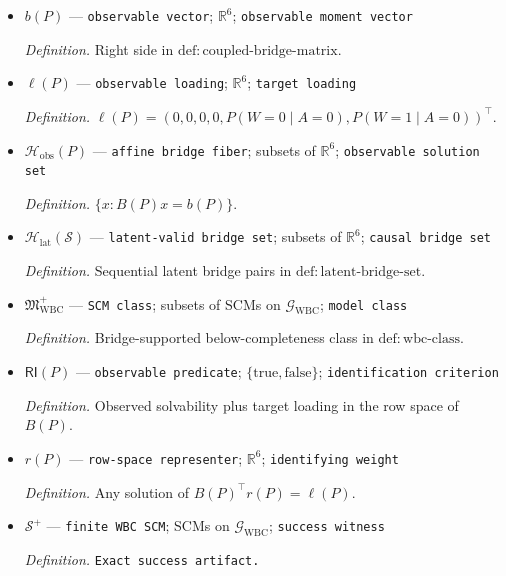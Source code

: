 \documentclass{article}
\begin{document}
\begin{itemize}
  \par\smallskip\noindent\emph{Definition.} Coupled bridge matrix in \(\mathrm{def{:}coupled\text{-}bridge\text{-}matrix}\).
  \item \(b(P)\) --- \texttt{observable vector}; \(\mathbb R^6\); \texttt{observable moment vector}
  \par\smallskip\noindent\emph{Definition.} Right side in \(\mathrm{def{:}coupled\text{-}bridge\text{-}matrix}\).
  \item \(\ell(P)\) --- \texttt{observable loading}; \(\mathbb R^6\); \texttt{target loading}
  \par\smallskip\noindent\emph{Definition.} \(\ell(P)=(0,0,0,0,P(W=0\mid A=0),P(W=1\mid A=0))^{\top}\).
  \item \(\mathcal H_{\mathrm{obs}}(P)\) --- \texttt{affine bridge fiber}; subsets of \(\mathbb R^6\); \texttt{observable solution set}
  \par\smallskip\noindent\emph{Definition.} \(\{x:B(P)x=b(P)\}\).
  \item \(\mathcal H_{\mathrm{lat}}(\mathcal S)\) --- \texttt{latent-\allowbreak{}valid bridge set}; subsets of \(\mathbb R^6\); \texttt{causal bridge set}
  \par\smallskip\noindent\emph{Definition.} Sequential latent bridge pairs in \(\mathrm{def{:}latent\text{-}bridge\text{-}set}\).
  \item \(\mathfrak M_{\mathrm{WBC}}^{+}\) --- \texttt{SCM class}; subsets of SCMs on \(\mathcal G_{\mathrm{WBC}}\); \texttt{model class}
  \par\smallskip\noindent\emph{Definition.} Bridge-supported below-completeness class in \(\mathrm{def{:}wbc\text{-}class}\).
  \item \(\mathsf{RI}(P)\) --- \texttt{observable predicate}; \(\{\mathrm{true},\mathrm{false}\}\); \texttt{identification criterion}
  \par\smallskip\noindent\emph{Definition.} Observed solvability plus target loading in the row space of \(B(P)\).
  \item \(r(P)\) --- \texttt{row-\allowbreak{}space representer}; \(\mathbb R^6\); \texttt{identifying weight}
  \par\smallskip\noindent\emph{Definition.} Any solution of \(B(P)^{\top}r(P)=\ell(P)\).
  \item \(\mathcal S^{+}\) --- \texttt{finite WBC SCM}; SCMs on \(\mathcal G_{\mathrm{WBC}}\); \texttt{success witness}
  \par\smallskip\noindent\emph{Definition.} \texttt{Exact success artifact.}

\end{itemize}
\end{document}
